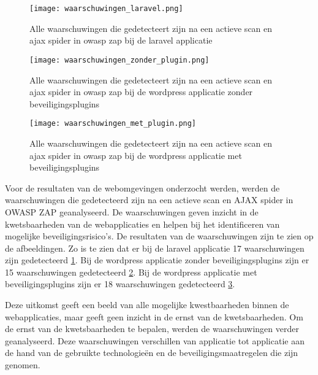 \begin{figure}
    \centering
    \texttt{[image: waarschuwingen\_laravel.png]}
    \caption[Alle waarschuwingen die gedetecteert zijn na een actieve scan en ajax spider in owasp zap bij de laravel applicatie]
    {Alle waarschuwingen die gedetecteert zijn na een actieve scan en ajax spider in owasp zap bij de laravel applicatie}
    \label{fig:waarschuwingen_laravel}
\end{figure}
\begin{figure}
    \centering
    \texttt{[image: waarschuwingen\_zonder\_plugin.png]}
    \caption[Alle waarschuwingen die gedetecteert zijn na een actieve scan en ajax spider in owasp zap bij de wordpress applicatie zonder beveiligingsplugins]
    {Alle waarschuwingen die gedetecteert zijn na een actieve scan en ajax spider in owasp zap bij de wordpress applicatie zonder beveiligingsplugins}
    \label{fig:waarschuwingen_zonder}
\end{figure}
\begin{figure}
    \centering
    \texttt{[image: waarschuwingen\_met\_plugin.png]}
    \caption[Alle waarschuwingen die gedetecteert zijn na een actieve scan en ajax spider in owasp zap bij de wordpress applicatie met beveiligingsplugins]
    {Alle waarschuwingen die gedetecteert zijn na een actieve scan en ajax spider in owasp zap bij de wordpress applicatie met beveiligingsplugins}
    \label{fig:waarschuwingen_met}
\end{figure}

Voor de resultaten van de webomgevingen onderzocht werden, werden de waarschuwingen die gedetecteerd zijn na een actieve scan en AJAX spider in OWASP ZAP 
geanalyseerd. De waarschuwingen geven inzicht in de kwetsbaarheden van de webapplicaties en helpen bij het identificeren van 
mogelijke beveiligingsrisico's. De resultaten van de waarschuwingen zijn te zien op de afbeeldingen. Zo is te zien dat er bij de 
laravel applicatie 17 waarschuwingen zijn gedetecteerd \ref{fig:waarschuwingen_laravel}. Bij de wordpress applicatie zonder 
beveiligingsplugins zijn er 15 waarschuwingen gedetecteerd \ref{fig:waarschuwingen_zonder}. Bij de wordpress 
applicatie met beveiligingsplugins zijn er 18 waarschuwingen gedetecteerd \ref{fig:waarschuwingen_met}.

Deze uitkomst geeft een beeld van alle mogelijke kwestbaarheden binnen de webapplicaties, maar geeft geen inzicht in de 
ernst van de kwetsbaarheden. Om de ernst van de kwetsbaarheden te bepalen, werden de waarschuwingen verder geanalyseerd. 
Deze waarschuwingen verschillen van applicatie tot applicatie aan de hand van de gebruikte technologieën en de 
beveiligingsmaatregelen die zijn genomen.


